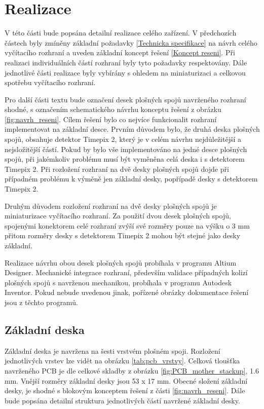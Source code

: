 \chapter{Realizace}
\label{realizace}
V této části bude popsána detailní realizace celého zařízení. V předchozích částech byly zmíněny základní požadavky \ref{Technicka specifikace} na návrh celého vyčítacího rozhraní a uveden základní koncept řešení \ref{Koncept reseni}. Při realizaci individuálních částí rozhraní byly tyto požadavky respektovány. Dále jednotlivé části realizace byly vybírány s ohledem na miniaturizaci a celkovou spotřebu vyčítacího rozhraní. 

\par Pro další části textu bude označení desek plošných spojů navrženého rozhraní shodné, s označením schematického návrhu konceptu řešení z obrázku \ref{fig:navrh_reseni}. Cílem řešení bylo co nejvíce funkcionalit rozhraní implementovat na základní desce. Prvním důvodem bylo, že druhá deska plošných spojů, obsahuje detektor Timepix 2, který je v celém návrhu nejdůležitější a nejsložitější částí. Pokud by bylo vše implementováno na jedné desce plošných spojů, při jakémkoliv problému musí být vyměněna celá deska i s detektorem Timepix 2. Při rozložení rozhraní na dvě desky plošných spojů dojde při případném problému k výměně jen základní desky, popřípadě desky s detektorem Timepix 2. 
\par Druhým důvodem rozložení rozhraní na dvě desky plošných spojů je miniaturizace vyčítacího rozhraní. Za použití dvou desek plošných spojů, spojenými konektorem celé rozhraní zvýší své rozměry pouze na výšku o 3 mm přitom rozměry desky s detektorem Timepix 2 mohou být stejné jako desky základní.

\par Realizace návrhu obou desek plošných spojů probíhala v programu Altium Designer. Mechanické integrace rozhraní, především validace případných kolizí plošných spojů s navrženou mechanikou, probíhala v programu Autodesk Inventor. Pokud nebude uvedenou jinak, pořízené obrázky dokumentace řešení jsou z těchto programů.

\section{Základní deska}	
	\label{zakladni deska}
	Základní deska je navržena na šesti vrstvém plošném spoji. Rozložení jednotlivých vrstev lze vidět na obrázku \ref{tab:pcb_vrstvy}. Celková tloušťka navrženého PCB je dle celkové skladby z obrázku \ref{fig:PCB_mother_stackup}, 1.6 mm. Vnější rozměry základní desky jsou 53 x 17 mm. Obecné složení základní desky, je shodné s blokovým konceptem řešení z části \ref{fig:navrh_reseni}. Dále bude popsána detailní struktura jednotlivých částí navržené základní desky.

